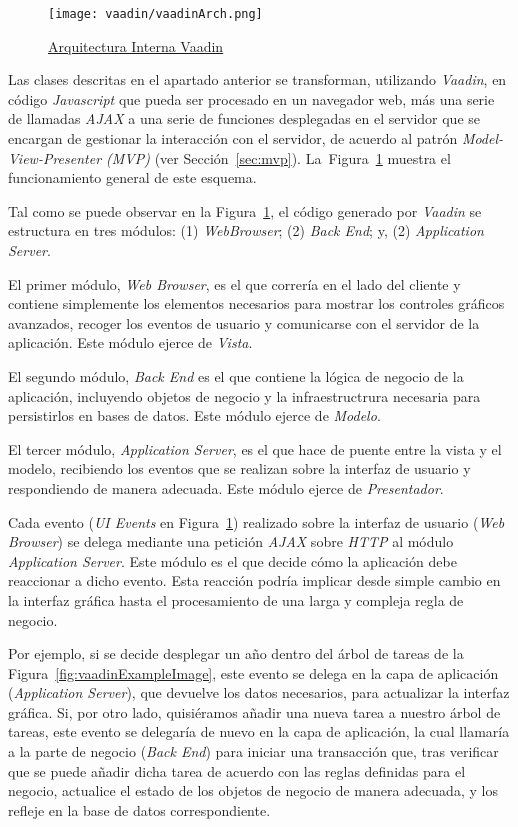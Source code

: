 \begin{figure}[H]
	\centering
	\texttt{[image: vaadin/vaadinArch.png]}
	\caption{\href{https://vaadin.com/docs/v8/framework/architecture/architecture-overview.html}{Arquitectura Interna Vaadin}}
	\label{fig:vaadinMVP}
	
\end{figure}

Las clases descritas en el apartado anterior se transforman, utilizando \emph{Vaadin}, en código \emph{Javascript} que pueda ser procesado en un navegador web, más una serie de llamadas \emph{AJAX} a una serie de funciones desplegadas en el servidor que se encargan de gestionar la interacción con el servidor, de acuerdo al patrón \emph{Model-View-Presenter (MVP)} (ver Sección~\ref{sec:mvp}). La~Figura~\ref{fig:vaadinMVP} muestra el funcionamiento general de este esquema.

Tal como se puede observar en la Figura~\ref{fig:vaadinMVP}, el código generado por \emph{Vaadin} se estructura en tres módulos: (1) \emph{WebBrowser}; (2) \emph{Back End}; y, (2) \emph{Application Server}.

El primer módulo, \emph{Web Browser}, es el que correría en el lado del cliente y contiene simplemente los elementos necesarios para mostrar los controles gráficos avanzados, recoger los eventos de usuario y comunicarse con el servidor de la aplicación. Este módulo ejerce de \emph{Vista}.

El segundo módulo, \emph{Back End} es el que contiene la lógica de negocio de la aplicación, incluyendo objetos de negocio y la infraestructrura necesaria para persistirlos en bases de datos. Este módulo ejerce de \emph{Modelo}.

El tercer módulo, \emph{Application Server}, es el que hace de puente entre la vista y el modelo, recibiendo los eventos que se realizan sobre la interfaz de usuario y respondiendo de manera adecuada. Este módulo ejerce de \emph{Presentador}.

Cada evento (\emph{UI Events} en Figura~\ref{fig:vaadinMVP}) realizado sobre la interfaz de usuario (\emph{Web Browser}) se delega mediante una petición \emph{AJAX} sobre \emph{HTTP} al módulo \emph{Application Server}. Este módulo es el que decide cómo la aplicación debe reaccionar a dicho evento. Esta reacción podría implicar desde simple cambio en la interfaz gráfica hasta el procesamiento de una larga y compleja regla de negocio. 

Por ejemplo, si se decide desplegar un año dentro del árbol de tareas de la Figura~\ref{fig:vaadinExampleImage}, este evento se delega en la capa de aplicación (\emph{Application Server}), que devuelve los datos necesarios, para actualizar la interfaz gráfica. Si, por otro lado, quisiéramos añadir una nueva tarea a nuestro árbol de tareas, este evento se delegaría de nuevo en la capa de aplicación, la cual llamaría a la parte de negocio (\emph{Back End}) para iniciar una transacción que, tras verificar que se puede añadir dicha tarea de acuerdo con las reglas definidas para el negocio, actualice el estado de los objetos de negocio de manera adecuada, y los refleje en la base de datos correspondiente. 



